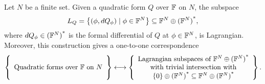 \begin{proposition} \label{prop:qfls}
  Let $N$ be a finite set. Given a quadratic form $Q$ over ${\mathbb F}$ on $N$, the
  subspace 
  \[ 
    L_Q = \big\{(\phi,dQ_\phi) \mid \phi \in {\mathbb F}^N\big\} \subseteq {{\mathbb F}^{N} \oplus {({\mathbb F}^{N})}^\ast},
  \] 
  where $dQ_\phi \in {({\mathbb F}^N)}^\ast$ is the formal differential of $Q$ at $\phi
  \in {\mathbb F}^N$, is Lagrangian. Moreover, this construction gives a one-to-one correspondence 
  \[ 
    \left\{\begin{array}{c} 
      \\ \mbox{Quadratic forms over ${\mathbb F}$ on $N$} \\ \phantom{.}
    \end{array} \right\} 
    \longleftrightarrow
    \left\{\begin{array}{c} 
      \mbox{Lagrangian subspaces of ${{\mathbb F}^{N} \oplus {({\mathbb F}^{N})}^\ast}$}\\
      \mbox{with trivial intersection with} \\ 
      \{0\} \oplus {({\mathbb F}^N)}^\ast \subseteq {{\mathbb F}^{N} \oplus {({\mathbb F}^{N})}^\ast} 
    \end{array} \right\}.  
  \]
\end{proposition}
